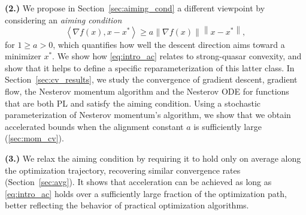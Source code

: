 \documentclass{article}
\newcommand{\norm}[1]{\left\lVert#1\right\rVert}
\newcommand{\dotprod}[1]{\left< #1\right>}
\theoremstyle{plain}
\theoremstyle{definition}
\theoremstyle{remark}
\begin{document}
\noindent \textbf{(2.)}  We propose in Section~\ref{sec:aiming_cond} a different viewpoint by considering an \textit{aiming condition}
\begin{equation}\label{eq:intro_ac}
    \dotprod{\nabla f(x),x-x^\ast} \ge a \norm{\nabla f(x)}\norm{x-x^\ast},
\end{equation}
for $1 \ge a>0$, which quantifies how well the descent direction aims toward a minimizer $x^\ast$. We show how \eqref{eq:intro_ac} relates to strong-quasar convexity, and show that it helps to define a specific reparameterization of this latter class. In Section~\ref{sec:cv_results}, we study the convergence of gradient descent, gradient flow, the Nesterov momentum algorithm and the Nesterov ODE for functions that are both PL and satisfy the aiming condition. Using a stochastic parameterization of Nesterov momentum's algorithm, we show that we obtain accelerated bounds when the alignment constant $a$ is sufficiently large (\cref{sec:mom_cv}). 


\noindent \textbf{(3.)} 
We relax the aiming condition by requiring it to hold only on average along the optimization trajectory, recovering similar convergence rates (Section~\ref{sec:avg}). 
 It shows that acceleration can be achieved as long as \eqref{eq:intro_ac} holds over a sufficiently large fraction of the optimization path,
 better reflecting the behavior of practical optimization algorithms.
%
\end{document}
